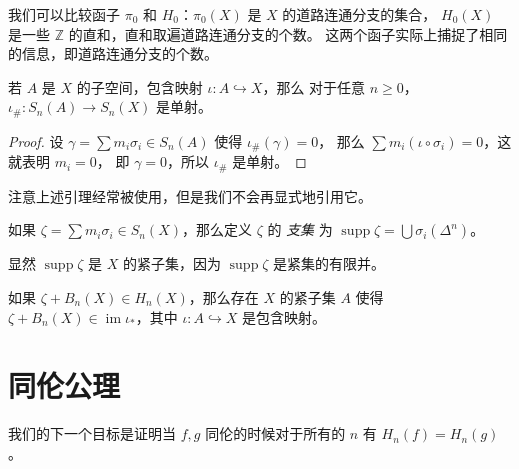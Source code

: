 \documentclass[fontset=none]{Notes}
\DeclareMathOperator\im{im}
\DeclareMathOperator\supp{supp}
\begin{document}
我们可以比较函子 $\pi_0$ 和 $H_0$：$\pi_0(X)$ 是 $X$ 的道路连通分支的集合，
$H_0(X)$ 是一些 $\mathbb{Z}$ 的直和，直和取遍道路连通分支的个数。
这两个函子实际上捕捉了相同的信息，即道路连通分支的个数。

\begin{lemma}
  若 $A$ 是 $X$ 的子空间，包含映射 $\iota:A\hookrightarrow X$，那么
  对于任意 $n\geq 0$，$\iota_\#:S_n(A)\to S_n(X)$ 是单射。
\end{lemma}
\begin{proof}
  设 $\gamma=\sum m_i\sigma_i\in S_n(A)$ 使得 $\iota_\#(\gamma)=0$，
  那么 $\sum m_i(\iota\circ\sigma_i)=0$，这就表明 $m_i=0$，
  即 $\gamma=0$，所以 $\iota_\#$ 是单射。
\end{proof}

注意上述引理经常被使用，但是我们不会再显式地引用它。

\begin{definition}
  如果 $\zeta=\sum m_i\sigma_i\in S_n(X)$，那么定义 $\zeta$ 的
  \emph{支集} 为 $\supp\zeta=\bigcup \sigma_i(\Delta^n)$。
\end{definition}

显然 $\supp\zeta$ 是 $X$ 的紧子集，因为 $\supp\zeta$ 是紧集的有限并。

\begin{theorem}
  如果 $\zeta+B_n(X)\in H_n(X)$，那么存在 $X$ 的紧子集 $A$ 使得
  $\zeta+B_n(X)\in\im\iota_*$，其中 $\iota:A\hookrightarrow X$ 是包含映射。
\end{theorem}

\section{同伦公理}

我们的下一个目标是证明当 $f,g$ 同伦的时候对于所有的 $n$
有 $H_n(f)=H_n(g)$。
\end{document}
